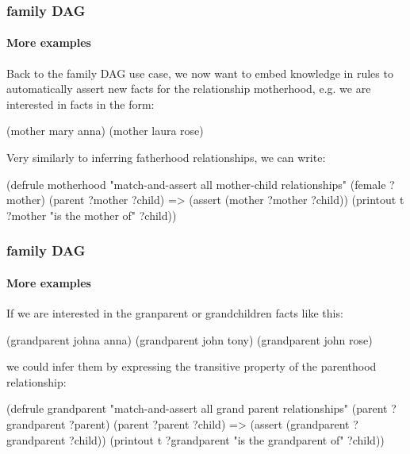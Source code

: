 \documentclass[xcolor={usenames,dvipsnames,svgnames}, compress]{beamer}
\begin{document}
\begin{frame}[fragile]
  \frametitle{family DAG}
  \framesubtitle{More examples}
  Back to the family DAG use case, we now want to embed knowledge in
  rules to automatically assert new facts for the relationship
  motherhood, e.g. we are interested in
  facts in the form:
  \begin{clips-code}[numbers=none]
    (mother mary anna)    (mother laura rose)
  \end{clips-code}
  
  Very similarly to inferring fatherhood relationships, we can write:
  
  \begin{clips-code}[numbers=none]
    (defrule motherhood
        "match-and-assert all mother-child relationships"
        (female ?mother)
        (parent ?mother ?child)
        =>
        (assert (mother ?mother ?child))
        (printout t ?mother "is the mother of" ?child))
  \end{clips-code}
\end{frame}

\begin{frame}[fragile]
  \frametitle{family DAG}
  \framesubtitle{More examples}

  If we are interested in the granparent or grandchildren facts like this:
  \begin{clips-code}[numbers=none]
    (grandparent johna anna) (grandparent john tony)
    (grandparent john rose)
  \end{clips-code}

  we could infer them by expressing the transitive property of the parenthood relationship:
  
  \begin{clips-code}[numbers=none]
    (defrule grandparent
        "match-and-assert all grand parent relationships"
        (parent ?grandparent ?parent)
        (parent ?parent ?child)
        =>
        (assert (grandparent ?grandparent ?child))
        (printout t ?grandparent "is the grandparent of" ?child))
  \end{clips-code}
\end{frame}

\end{document}
